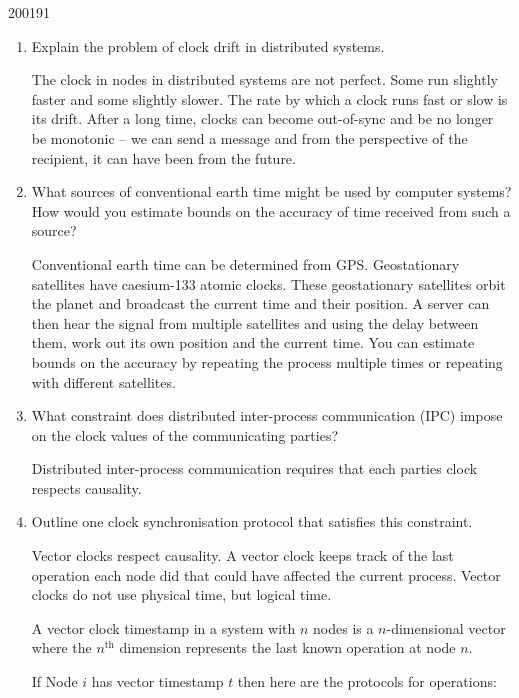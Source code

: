 \documentclass[10pt,\jkfside,a4paper]{article}
\begin{document}
\begin{examquestion}{2001}{9}{1}

\begin{enumerate}[label=(\alph*)]

\item Explain the problem of clock drift in distributed systems.

The clock in nodes in distributed systems are not perfect. Some run
slightly faster and some slightly slower. The rate by which a clock runs
fast or slow is its drift. After a long time, clocks can become out-of-sync
and be no longer be monotonic -- we can send a message and from the
perspective of the recipient, it can have been from the future.

\item What sources of conventional earth time might be used by computer
systems? How would you estimate bounds on the accuracy of time received from
such a source?

Conventional earth time can be determined from GPS\@. Geostationary
satellites have caesium-133 atomic clocks. These geostationary satellites
orbit the planet and broadcast the current time and their position. A
server can then hear the signal from multiple satellites and using the
delay between them, work out its own position and the current time. You can
estimate bounds on the accuracy by repeating the process multiple times or
repeating with different satellites.

\item What constraint does distributed inter-process communication (IPC)
impose on the clock values of the communicating parties?

Distributed inter-process communication requires that each parties clock
respects causality.

\item Outline one clock synchronisation protocol that satisfies this
constraint.

Vector clocks respect causality. A vector clock keeps track of the last
operation each node did that could have affected the current process. Vector
clocks do not use physical time, but logical time.

A vector clock timestamp in a system with $n$ nodes is a $n$-dimensional
vector where the $n^{\text{th}}$ dimension represents the last known
operation at node $n$.

If Node $i$ has vector timestamp $t$ then here are the protocols for
operations:

\begin{itemize}


\end{itemize}
\end{enumerate}
\end{examquestion}
\end{document}
